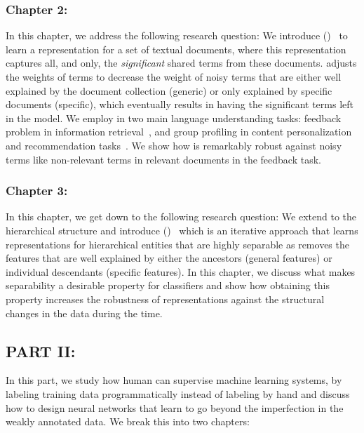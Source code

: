 \subsubsection*{Chapter 2: }
In this chapter, we address the following research question:
We introduce \emph{\swlm} (\acswlm)~\citep{Dehghani:2016:SIGIR} to learn a representation for a set of textual documents, where this representation captures all, and only, the \textit{significant} shared terms from these documents.  \acswlm adjusts the weights of terms to decrease the weight of noisy terms that are either well explained by the document collection (generic) or only explained by specific documents (specific), which eventually results in having the significant terms left in the model.  
We employ \acswlm in two main language understanding tasks: feedback problem in information retrieval~\citep{Dehghani:CIKM2016:long, Dehghani:CIKM2016:short}, and group profiling in content personalization and recommendation tasks~\citep{Dehghani:2016:CHIIR,Dehghani2016:trec}. We show how \acswlm is remarkably robust against noisy terms like non-relevant terms in relevant documents in the feedback task. 

\subsubsection*{Chapter 3: }
In this chapter, we get down to the following research question:
We extend \emph{\swlms} to the hierarchical structure and introduce \emph{\hswlms} (\achswlm)~\citep{Dehghani:2016:ICTIR, Dehghani:2016:CLEF} which is an iterative approach that learns representations for hierarchical entities that are highly separable as \acswlm removes the features that are well explained by either the ancestors (general features) or individual descendants (specific features). In this chapter, we discuss what makes separability a desirable property for classifiers and show how obtaining this property increases the robustness of representations against the structural changes in the data during the time.

\subsection*{PART II: }
In this part, we study how human can supervise machine learning systems, by labeling training data programmatically instead of labeling by hand and discuss how to design neural networks that learn to go beyond the imperfection in the weakly annotated data. We break this into two chapters:

